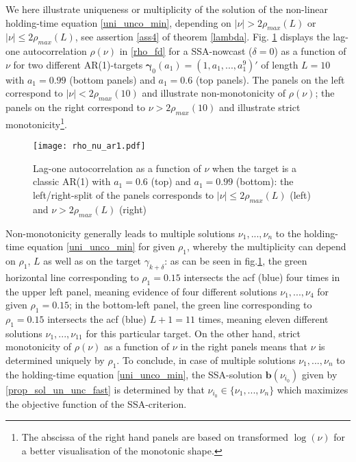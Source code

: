 \documentclass[a4paper]{article}
\begin{document}
We here illustrate uniqueness or multiplicity of the solution of the non-linear holding-time equation \ref{uni_unco_min}, depending on $|\nu|>2\rho_{max}(L)$ or $|\nu|\leq 2\rho_{max}(L)$, see assertion \ref{ass4} of theorem \ref{lambda}. Fig. \ref{rho_nu_ar1}  displays the lag-one autocorrelation  $\rho(\nu)$ in \ref{rho_fd} for a SSA-nowcast ($\delta=0$) as a function of $\nu$ for two different AR(1)-targets $\boldsymbol{\gamma}_{0}(a_1)=(1,a_1,...,a_1^9)'$ of length $L=10$  with $a_1=0.99$ (bottom panels) and $a_1=0.6$ (top panels). The panels on the left correspond to $|\nu|<2\rho_{max}(10)$ and illustrate non-monotonicity of $\rho(\nu)$; the panels on the right correspond to  $\nu>2\rho_{max}(10)$ and illustrate strict monotonicity\footnote{The abscissa of the right hand panels are based on transformed $\log(\nu)$ for a better visualisation of the monotonic shape.}. 
\begin{figure}[H]\begin{center}\texttt{[image: rho\_nu\_ar1.pdf]}\caption{Lag-one autocorrelation as a function of $\nu$ when the target is a classic AR(1) with $a_1=0.6$ (top) and $a_1=0.99$ (bottom): the left/right-split of the panels corresponds to $|\nu|\leq 2 \rho_{max}(L)$ (left) and $\nu>2 \rho_{max}(L)$  (right)\label{rho_nu_ar1}}\end{center}\end{figure}Non-monotonicity generally leads to multiple solutions $\nu_1,...,\nu_n$  to the holding-time equation \ref{uni_unco_min} for given $\rho_1$, whereby the multiplicity can depend on $\rho_1$, $L$ as well as on the target $\gamma_{k+\delta}$: as can be seen in fig.\ref{rho_nu_ar1}, the green horizontal line corresponding to $\rho_1=0.15$  intersects the acf (blue) four times in the upper left panel, meaning evidence of four different solutions $\nu_1,...,\nu_4$ for given $\rho_1=0.15$; in the bottom-left panel, the green line corresponding to $\rho_1=0.15$ intersects the acf (blue) $L+1=11$ times, meaning eleven different solutions $\nu_1,...,\nu_{11}$ for this particular target. On the other hand, strict monotonicity of $\rho(\nu)$ as a function of $\nu$ in the right panels means that $\nu$ is determined uniquely by $\rho_1$. To conclude, in case of multiple solutions $\nu_1,...,\nu_n$ to the holding-time equation \ref{uni_unco_min}, the SSA-solution $\mathbf{b}(\nu_{i_0})$ given by \ref{prop_sol_un_unc_fast}  is determined by that $\nu_{i_0}\in\{\nu_1,...,\nu_n\}$ which maximizes the objective function of the SSA-criterion.  
\end{document}
